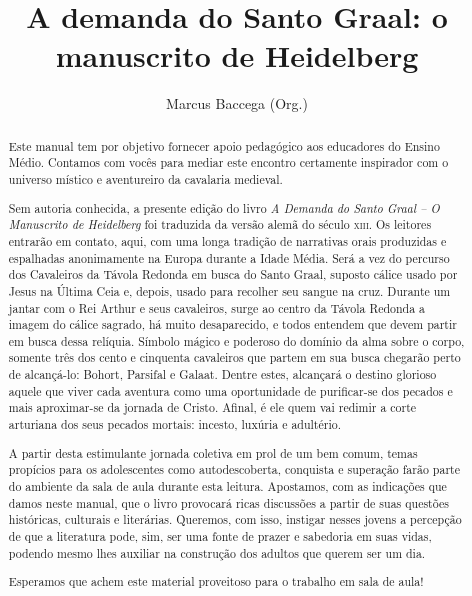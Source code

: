 \documentclass[11pt]{extarticle}
\begin{document}
\newcommand{\AutorLivro}{Marcus Baccega (Org.)}
\newcommand{\TituloLivro}{A demanda do Santo Graal: o manuscrito de Heidelberg}
\newcommand{\Tema}{Ficção, mistério e fantasia}
\newcommand{\Genero}{Conto, crônica e novela}
\newcommand{\imagemCapa}{./images/PNLD0006-01.png}
\newcommand{\issnppub}{978-65-994304-1-1}
\newcommand{\issnepub}{978-65-994304-0-4}
\newcommand{\colaborador}{Clarisse Assalim, Bruno Gradella e Vicente Castro}




\title{\TituloLivro}
\author{\AutorLivro}
\def\authornotes{\colaborador}

\date{}
\maketitle


\begin{abstract}

Este manual tem por objetivo fornecer apoio pedagógico aos educadores do 
Ensino Médio. Contamos com vocês para mediar este encontro certamente 
inspirador com o universo místico e aventureiro da cavalaria medieval.

Sem autoria conhecida, a presente edição do livro \emph{A Demanda do Santo Graal -- 
O Manuscrito de Heidelberg} foi traduzida da versão alemã do século \textsc{xiii}. 
Os leitores entrarão em contato, aqui, com uma longa tradição de narrativas orais 
produzidas e espalhadas anonimamente na Europa durante a Idade Média. Será a vez 
do percurso dos Cavaleiros da Távola Redonda em busca do Santo Graal, suposto 
cálice usado por Jesus na Última Ceia e, depois, usado para recolher seu sangue na cruz. 
Durante um jantar com o Rei Arthur e seus cavaleiros, surge ao centro da Távola Redonda 
a imagem do cálice sagrado, há muito desaparecido, e todos entendem que devem partir 
em busca dessa relíquia. Símbolo mágico e poderoso do domínio da alma sobre o corpo, 
somente três dos cento e cinquenta cavaleiros que partem em sua busca chegarão perto 
de alcançá-lo: Bohort, Parsifal e Galaat. Dentre estes, alcançará o destino glorioso 
aquele que viver cada aventura como uma oportunidade de purificar-se dos pecados e mais 
aproximar-se da jornada de Cristo. Afinal, é ele quem vai redimir a corte arturiana 
dos seus pecados mortais: incesto, luxúria e adultério.

A partir desta estimulante jornada coletiva em prol de um bem comum, temas 
propícios para os adolescentes como autodescoberta, conquista e superação 
farão parte do ambiente da sala de aula durante esta leitura. Apostamos, 
com as indicações que damos neste manual, que o livro provocará ricas 
discussões a partir de suas questões históricas, culturais e literárias. 
Queremos, com isso, instigar nesses jovens a percepção de que a literatura 
pode, sim, ser uma fonte de prazer e sabedoria em suas vidas, podendo mesmo 
lhes auxiliar na construção dos adultos que querem ser um dia. 

Esperamos que achem este material proveitoso para o trabalho em sala de aula!

\end{abstract}
\end{document}
